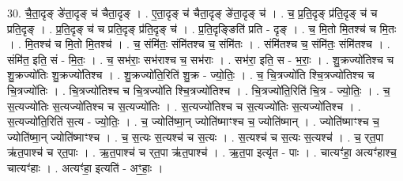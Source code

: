 \documentclass[17pt]{extarticle}
\begin{document}
30. चै॒ता॒दृङ् ङे॑ता॒दृङ् च॑ चैता॒दृङ् । . ए॒ता॒दृङ् च॑ चैता॒दृङ् ङे॑ता॒दृङ् च॑ । . च॒ प्र॒ति॒दृङ् प्र॑ति॒दृङ् च॑ च प्रति॒दृङ् । . प्र॒ति॒दृङ् च॑ च प्रति॒दृङ् प्र॑ति॒दृङ् च॑ । . प्र॒ति॒दृङ्ङिति॑ प्रति - दृङ् । . च॒ मि॒तो मि॒तश्च॑ च मि॒तः । . मि॒तश्च॑ च मि॒तो मि॒तश्च॑ । . च॒ संमि॑तः॒ संमि॑तश्च च॒ संमि॑तः । . संमि॑तश्च च॒ संमि॑तः॒ संमि॑तश्च । . संमि॑त॒ इति॒ सं - मि॒तः॒ । . च॒ सभ॑राः॒ सभ॑राश्च च॒ सभ॑राः । . सभ॑रा॒ इति॒ स - भ॒राः॒ । . शु॒क्रज्यो॑तिश्च च शु॒क्रज्यो॑तिः शु॒क्रज्यो॑तिश्च । . शु॒क्रज्यो॑ति॒रिति॑ शु॒क्र - ज्यो॒तिः॒ । . च॒ चि॒त्रज्यो॑ति श्चि॒त्रज्यो॑तिश्च च चि॒त्रज्यो॑तिः । . चि॒त्रज्यो॑तिश्च च चि॒त्रज्यो॑ति श्चि॒त्रज्यो॑तिश्च । . चि॒त्रज्यो॑ति॒रिति॑ चि॒त्र - ज्यो॒तिः॒ । . च॒ स॒त्यज्यो॑तिः स॒त्यज्यो॑तिश्च च स॒त्यज्यो॑तिः । . स॒त्यज्यो॑तिश्च च स॒त्यज्यो॑तिः स॒त्यज्यो॑तिश्च । . स॒त्यज्यो॑ति॒रिति॑ स॒त्य - ज्यो॒तिः॒ । . च॒ ज्योति॑ष्मा॒न् ज्योति॑ष्माꣳश्च च॒ ज्योति॑ष्मान् । . ज्योति॑ष्माꣳश्च च॒ ज्योति॑ष्मा॒न् ज्योति॑ष्माꣳश्च । . च॒ स॒त्यः स॒त्यश्च॑ च स॒त्यः । . स॒त्यश्च॑ च स॒त्यः स॒त्यश्च॑ । . च॒ र्‌त॒पा ऋ॑त॒पाश्च॑ च र्‌त॒पाः । . ऋ॒त॒पाश्च॑ च र्‌त॒पा ऋ॑त॒पाश्च॑ । . ऋ॒त॒पा इत्यृ॑त - पाः । . चात्यꣳ॑हा॒ अत्यꣳ॑हाश्च॒ चात्यꣳ॑हाः । . अत्यꣳ॑हा॒ इत्यति॑ - अꣳ॒॒हाः॒ । \newline
\end{document}
